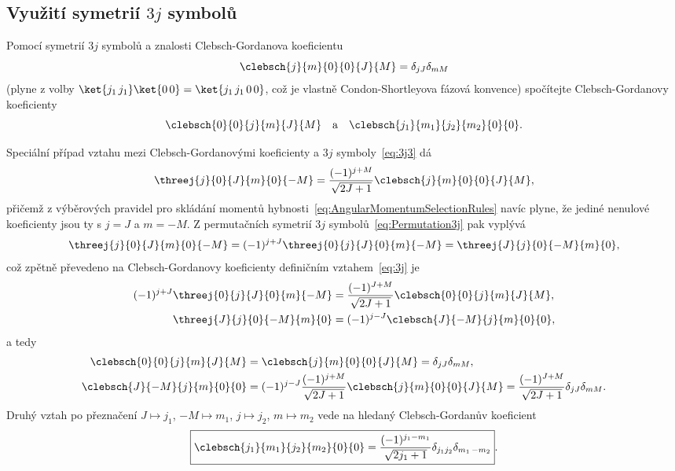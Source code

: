 \subsection{Využití symetrií $3j$ symbolů}
Pomocí symetrií $3j$ symbolů a znalosti Clebsch-Gordanova koeficientu 
\begin{equation}
    \clebsch{j}{m}{0}{0}{J}{M}=\delta_{jJ}\delta_{mM}
\end{equation}
(plyne z volby $\ket{j_{1}\,j_{1}}\ket{0\,0}=\ket{j_{1}\,j_{1}\,0\,0}$, 
což je vlastně Condon-Shortleyova fázová konvence) spočítejte Clebsch-Gordanovy koeficienty
\begin{equation}
    \clebsch{0}{0}{j}{m}{J}{M}\quad\mathrm{a}\quad\clebsch{j_{1}}{m_{1}}{j_{2}}{m_{2}}{0}{0}.
\end{equation}

\begin{solution}
	Speciální případ vztahu mezi Clebsch-Gordanovými koeficienty a $3j$ symboly~\eqref{eq:3j3} dá
	\begin{align}
		\threej{j}{0}{J}{m}{0}{-M}=\frac{(-1)^{j+M}}{\sqrt{2J+1}}\clebsch{j}{m}{0}{0}{J}{M},
	\end{align}
	přičemž z výběrových pravidel pro skládání momentů hybnosti~\eqref{eq:AngularMomentumSelectionRules} navíc plyne, že jediné nenulové koeficienty jsou ty s $j=J$ a $m=-M$.
	Z permutačních symetrií $3j$ symbolů~\eqref{eq:Permutation3j} pak vyplývá
	\begin{equation}
		\threej{j}{0}{J}{m}{0}{-M}
			=(-1)^{j+J}\threej{0}{j}{J}{0}{m}{-M}
			=\threej{J}{j}{0}{-M}{m}{0},
	\end{equation}
	což zpětně převedeno na Clebsch-Gordanovy koeficienty definičním vztahem~\eqref{eq:3j} je
	\begin{align*}
		(-1)^{j+J}\threej{0}{j}{J}{0}{m}{-M}
			&=\frac{(-1)^{J+M}}{\sqrt{2J+1}}\clebsch{0}{0}{j}{m}{J}{M},\\
		\threej{J}{j}{0}{-M}{m}{0}
			&=(-1)^{j-J}\clebsch{J}{-M}{j}{m}{0}{0},
	\end{align*}
	a tedy
    \begin{subequations}
        \begin{align}
            \clebsch{0}{0}{j}{m}{J}{M}
                &=\clebsch{j}{m}{0}{0}{J}{M}=\delta_{jJ}\delta_{mM},\\
            \clebsch{J}{-M}{j}{m}{0}{0}
                &=(-1)^{j-J}\frac{(-1)^{j+M}}{\sqrt{2J+1}}\clebsch{j}{m}{0}{0}{J}{M}
                 =\frac{(-1)^{J+M}}{\sqrt{2J+1}}\delta_{jJ}\delta_{mM}.
        \end{align}            
    \end{subequations}
	Druhý vztah po přeznačení
	$J\mapsto j_{1}$, $-M\mapsto m_{1}$, $j\mapsto j_{2}$, $m\mapsto m_{2}$ 
	vede na hledaný Clebsch-Gordanův koeficient
	\begin{equation}
		\label{eq:ClebschGordan00}
		\boxed{
			\clebsch{j_{1}}{m_{1}}{j_{2}}{m_{2}}{0}{0}
				=\frac{(-1)^{j_{1}-m_{1}}}{\sqrt{2j_{1}+1}}\delta_{j_{1}j_{2}}\delta_{m_{1}\,-m_{2}}
		}.
	\end{equation}
\end{solution}